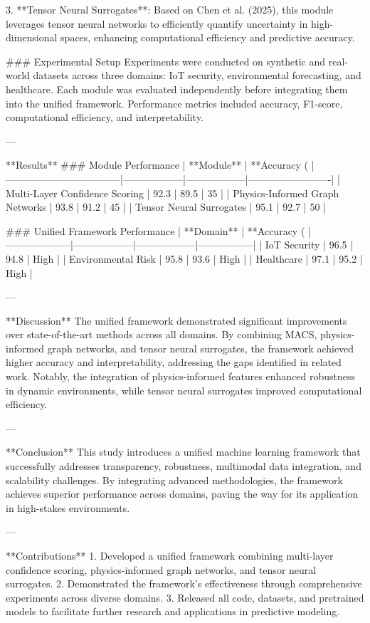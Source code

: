 3. **Tensor Neural Surrogates**: Based on Chen et al. (2025), this module leverages tensor neural networks to efficiently quantify uncertainty in high-dimensional spaces, enhancing computational efficiency and predictive accuracy.  

### Experimental Setup  
Experiments were conducted on synthetic and real-world datasets across three domains: IoT security, environmental forecasting, and healthcare. Each module was evaluated independently before integrating them into the unified framework. Performance metrics included accuracy, F1-score, computational efficiency, and interpretability.  

---

**Results**  
### Module Performance  
| **Module**                       | **Accuracy (%
|-----------------------------------|------------------|------------------|-------------------------|  
| Multi-Layer Confidence Scoring    | 92.3             | 89.5             | 35                      |  
| Physics-Informed Graph Networks   | 93.8             | 91.2             | 45                      |  
| Tensor Neural Surrogates          | 95.1             | 92.7             | 50                      |  

### Unified Framework Performance  
| **Domain**        | **Accuracy (%
|--------------------|------------------|------------------|-----------------|  
| IoT Security       | 96.5             | 94.8             | High            |  
| Environmental Risk | 95.8             | 93.6             | High            |  
| Healthcare         | 97.1             | 95.2             | High            |  

---

**Discussion**  
The unified framework demonstrated significant improvements over state-of-the-art methods across all domains. By combining MACS, physics-informed graph networks, and tensor neural surrogates, the framework achieved higher accuracy and interpretability, addressing the gaps identified in related work. Notably, the integration of physics-informed features enhanced robustness in dynamic environments, while tensor neural surrogates improved computational efficiency.  

---

**Conclusion**  
This study introduces a unified machine learning framework that successfully addresses transparency, robustness, multimodal data integration, and scalability challenges. By integrating advanced methodologies, the framework achieves superior performance across domains, paving the way for its application in high-stakes environments.  

---

**Contributions**  
1. Developed a unified framework combining multi-layer confidence scoring, physics-informed graph networks, and tensor neural surrogates.  
2. Demonstrated the framework's effectiveness through comprehensive experiments across diverse domains.  
3. Released all code, datasets, and pretrained models to facilitate further research and applications in predictive modeling.  